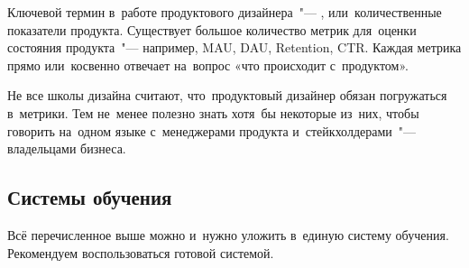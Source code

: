 Ключевой термин в~работе продуктового дизайнера~"--- ,
или~количественные показатели продукта. Существует большое
количество метрик для~оценки состояния продукта~"--- например, MAU,
DAU, Retention, CTR. Каждая метрика прямо или~косвенно отвечает
на~вопрос «что происходит с~продуктом».

Не все школы дизайна считают, что~продуктовый дизайнер обязан
погружаться в~метрики. Тем не~менее полезно знать хотя~бы некоторые
из~них, чтобы говорить на~одном языке с~менеджерами продукта
и~стейкхолдерами~"--- владельцами бизнеса. 

\subsection{Системы обучения}

Всё перечисленное выше можно и~нужно уложить в~единую систему
обучения. Рекомендуем воспользоваться готовой системой.


